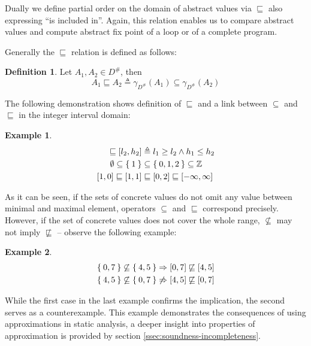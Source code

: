 \documentclass[12pt,oneside]{fithesis2}
\theoremstyle{definition}
\newtheorem{exmp}{Example}[section]
\newtheorem{definition}{Definition}
\begin{document}
Dually we define partial order on the domain of abstract values via $\sqsubseteq$ also expressing ``is included in''. Again, this relation enables us to compare abstract values and compute abstract fix point of a loop or of a complete program.

Generally the $\sqsubseteq$ relation is defined as follows:

\begin{definition}
  Let $A_1, A_2 \in D^\#$, then
  \[
    A_1 \sqsubseteq A_2 \triangleq \gamma_{D^\#}(A_1) \subseteq \gamma_{D^\#}(A_2)
  \]
\end{definition}


The following demonstration shows definition of $\sqsubseteq$ and a link between $\subseteq$ and $\sqsubseteq$ in the integer interval domain:

\begin{exmp}
  \begin{align*}
    [l_1, h_1] \sqsubseteq [l_2, h_2] &\triangleq l_1 \ge l_2 \wedge h_1 \le h_2\\
    \emptyset \subseteq \Set{1} &\subseteq \Set{0, 1, 2} \subseteq \mathbb Z\\
    [1,0] \sqsubseteq [1,1] &\sqsubseteq [0,2] \sqsubseteq [-\infty,\infty]
  \end{align*}
\end{exmp}

As it can be seen, if the sets of concrete values do not omit any value between minimal and maximal element, operators $\subseteq$ and $\sqsubseteq$ correspond precisely. However, if the set of concrete values does not cover the whole range, $\not\subseteq$ may not imply $\not\sqsubseteq$ -- observe the following example:

\begin{exmp}
  \begin{align*}
    \Set{0, 7} \not\subseteq \Set{4, 5} &\Rightarrow [0,7] \not\sqsubseteq [4,5]\\
    \Set{ 4, 5} \not\subseteq \Set{0, 7} &\not\Rightarrow [4,5] \not\sqsubseteq [0,7]\\
  \end{align*}
\end{exmp}

While the first case in the last example confirms the implication, the second serves as a counterexample. This example demonstrates the consequences of using approximations in static analysis, a deeper insight into properties of approximation is provided by section \ref{ssec:soundness-incompleteness}.
\end{document}
